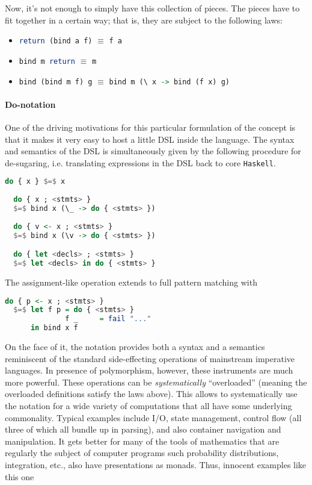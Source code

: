 Now, it's not enough to simply have this collection of pieces. The
pieces have to fit together in a certain way; that is, they are
subject to the following laws:

\begin{itemize}
  \item \lstinline[language=Haskell]!return (bind a f)! $\equiv$ \lstinline[language=Haskell]!f a! %
  \item \lstinline[language=Haskell]!bind m return! $\equiv$ \lstinline[language=Haskell]!m! %
  \item \lstinline[language=Haskell]!bind (bind m f) g! $\equiv$ \lstinline[language=Haskell]!bind m (\ x -> bind (f x) g)! %
\end{itemize}

\paragraph{Do-notation}
One of the driving motivations for this particular formulation of the
concept is that it makes it very easy to host a little DSL inside the
language. The syntax and semantics of the DSL is simultaneously given
by the following procedure for de-sugaring, i.e. translating
expressions in the DSL back to core \texttt{Haskell}.

\break
\begin{lstlisting}[language=Haskell,mathescape=true,frame=single,caption={do-notation de-sugaring},captionpos=b]
  do { x } $=$ x
 
  do { x ; <stmts> }
  $=$ bind x (\_ -> do { <stmts> })
 
  do { v <- x ; <stmts> }
  $=$ bind x (\v -> do { <stmts> }) 

  do { let <decls> ; <stmts> }
  $=$ let <decls> in do { <stmts> }
\end{lstlisting} 

The assignment-like operation extends to full pattern matching with

\begin{lstlisting}[language=Haskell,mathescape=true]
  do { p <- x ; <stmts> }
  $=$ let f p = do { <stmts> }
              f _     = fail "..."
      in bind x f
\end{lstlisting}

On the face of it, the notation provides both a syntax and a semantics
reminiscent of the standard side-effecting operations of mainstream
imperative languages. In presence of polymorphism, however, these
instruments are much more powerful. These operations can be
\emph{systematically} ``overloaded'' (meaning the overloaded
definitions satisfy the laws above). This allows to systematically use
the notation for a wide variety of computations that all have some
underlying commonality. Typical examples include I/O, state
management, control flow (all three of which all bundle up in
parsing), and also container navigation and manipulation. It gets
better for many of the tools of mathematics that are regularly the
subject of computer programs such probability distributions,
integration, etc., also have presentations as monads. Thus, innocent
examples like this one

